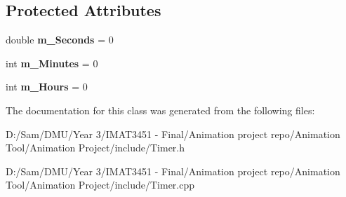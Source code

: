 \subsection*{Protected Attributes}
\begin{DoxyCompactItemize}
\item 
\mbox{\label{class_q_1_1_time_a5656ba36518d75edbfbedb5d8b8d68d7}} 
double {\bfseries m\+\_\+\+Seconds} = 0
\item 
\mbox{\label{class_q_1_1_time_afe9a334e8fcd9970c34dd8c3ee119c89}} 
int {\bfseries m\+\_\+\+Minutes} = 0
\item 
\mbox{\label{class_q_1_1_time_a9628290ab6284dc03258744faccabe9d}} 
int {\bfseries m\+\_\+\+Hours} = 0
\end{DoxyCompactItemize}


The documentation for this class was generated from the following files\+:\begin{DoxyCompactItemize}
\item 
D\+:/\+Sam/\+D\+M\+U/\+Year 3/\+I\+M\+A\+T3451 -\/ Final/\+Animation project repo/\+Animation Tool/\+Animation Project/include/Timer.\+h\item 
D\+:/\+Sam/\+D\+M\+U/\+Year 3/\+I\+M\+A\+T3451 -\/ Final/\+Animation project repo/\+Animation Tool/\+Animation Project/include/Timer.\+cpp\end{DoxyCompactItemize}
